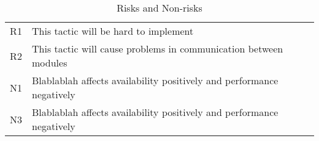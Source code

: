 \begin{table}[H]
	\begin{center}
		\begin{tabular}{| c | p{14cm} | }
    		\hline
			R1		&	This tactic will be hard to implement		\\
			R2		& 	This tactic will cause problems in communication between modules 		\\	
			N1		&	Blablablah affects availability positively and performance negatively		\\
			N3		& 	Blablablah affects availability positively and performance negatively		\\															
			\hline
    	\end{tabular}
	\end{center}
	\label{tab:risksNonRisk}
	\caption{Risks and Non-risks}
\end{table}